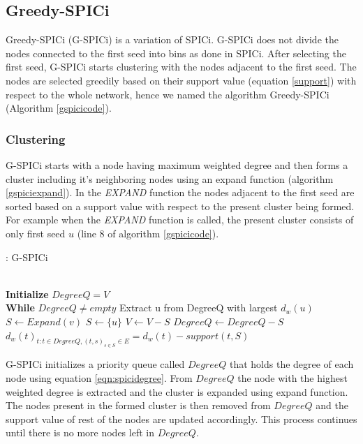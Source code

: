 \documentclass[a4paper,twocolumn,preprint]{elsarticle}
\begin{document}
\subsection{Greedy-SPICi}
Greedy-SPICi (G-SPICi) is a variation of SPICi. G-SPICi does not divide the nodes connected to the first seed into bins as done in SPICi. After selecting the first seed, G-SPICi starts clustering with the nodes adjacent to the first seed. The nodes are selected greedily based on their support value (equation \ref{support}) with respect to the whole network, hence we named the algorithm Greedy-SPICi (Algorithm \ref{gspicicode}).
\subsubsection{Clustering}
G-SPICi starts with a node having maximum weighted degree and then forms a cluster including it's neighboring nodes using an expand function (algorithm \ref{gspiciexpand}).
In the \emph{EXPAND} function the nodes adjacent to the first seed are sorted based on a support value with respect to the present cluster being formed. For example when the \emph{EXPAND} function is called, the present cluster consists of only first seed $u$ (line 8 of algorithm \ref{gspicicode}).
\begin{algorithm}
	\caption{: G-SPICi}\label{gspicicode}
	\begin{algorithmic}[1]
		 \\
		\textbf{Initialize} $DegreeQ = V$ \\
		\textbf{While} $DegreeQ \neq empty$
		\State Extract u from DegreeQ with largest $d_w(u)$
		\State $S \gets Expand(v)$
		\Else 
		\State $S \gets \{u\}$
		\EndIf
		\State $V \gets V - S $
		\State $Degree Q \gets Degree Q - S$
		\State $d_w(t)_{t:t\in DegreeQ,(t,s)_{s\in S}\in E} = d_w(t) - support(t,S)$
		\EndProcedure
	\end{algorithmic}
\end{algorithm}


G-SPICi initializes a priority queue called $DegreeQ$ that holds the degree of each node using equation \ref{eqn:spicidegree}. From $DegreeQ$ the node with the highest weighted degree is extracted and the cluster is expanded using expand function. The nodes present in the formed cluster is then removed from $DegreeQ$ and the support value of rest of the nodes are updated accordingly. This process continues until there is no more nodes left in $DegreeQ$.
\end{document}
